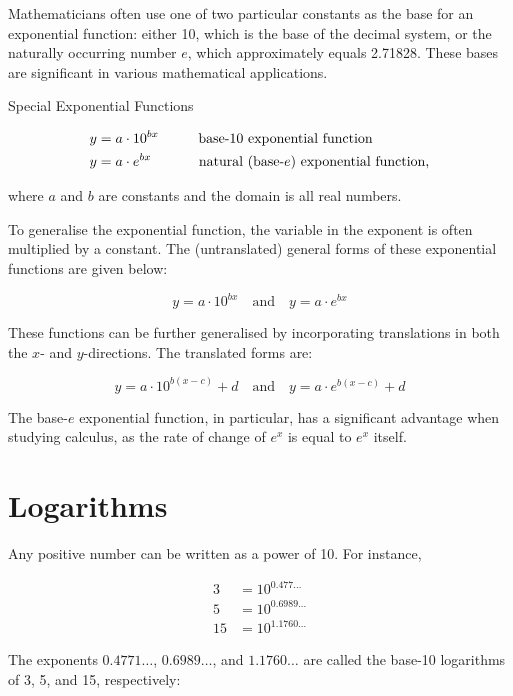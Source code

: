 Mathematicians often use one of two particular constants as the base for an exponential function: either 10, which is the base of the decimal system, or the naturally occurring number \( e \), which approximately equals 2.71828. These bases are significant in various mathematical applications.

\begin{definition}{Special Exponential Functions}

\begin{align*}
y &= a \cdot 10^{bx} \hspace{1cm} \text{base-10 exponential function} \\
y &= a \cdot e^{bx}  \hspace{1.2cm} \text{natural (base-}e\text{) exponential function,}
\end{align*}

where $a$ and $b$ are constants and the domain is all real numbers.
    
\end{definition}

To generalise the exponential function, the variable in the exponent is often multiplied by a constant. The (untranslated) general forms of these exponential functions are given below:

\[
y = a \cdot 10^{bx}
\quad \text{and} \quad
y = a \cdot e^{bx}
\]

These functions can be further generalised by incorporating translations in both the \(x\)- and \(y\)-directions. The translated forms are:

\[
y = a \cdot 10^{b(x - c)} + d
\quad \text{and} \quad
y = a \cdot e^{b(x - c)} + d
\]

The base-\(e\) exponential function, in particular, has a significant advantage when studying calculus, as the rate of change of \(e^x\) is equal to \(e^x\) itself.

\section{Logarithms}
Any positive number can be written as a power of 10. For instance,

\[
\begin{aligned}
3 & = 10^{0.477 \ldots} \\
5 & = 10^{0.6989 \ldots} \\
15 & = 10^{1.1760 \ldots}
\end{aligned}
\]

The exponents \(0.4771 \ldots\), \(0.6989 \ldots\), and \(1.1760 \ldots\) are called the base-10 logarithms of 3, 5, and 15, respectively:

